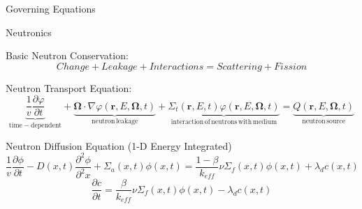 \documentclass{beamer}
\begin{document}
\begin{section}{Governing Equations}
\begin{frame}{Neutronics}
\begin{customlist}{2ex}{0pt}

    \item Basic Neutron Conservation:
    \[
      \nonumber Change + Leakage + Interactions = Scattering + Fission
    \]

    \item Neutron Transport Equation:
    \[
      \nonumber {\underbrace{\frac{1}{v}\frac{\partial\varphi}{\partial t}}_{\mathrm{time-dependent}}} + {\underbrace{\mathbf{\Omega}\cdot\nabla\varphi\left(\mathbf{r},E,\mathbf{\Omega},t\right)}_{\mathrm{neutron\, leakage}}}+\underbrace{\Sigma_{t}\left(\mathbf{r},E,t\right)\varphi\left(\mathbf{r},E,\mathbf{\Omega},t\right)}_{\mathrm{interaction\, of\, neutrons\, with\, medium}}=\underbrace{Q\left(\mathbf{r},E,\mathbf{\Omega},t\right)}_{\mathrm{neutron\, source}}
    \]

    \item Neutron Diffusion Equation (1-D Energy Integrated)
    \[
     \nonumber\frac{1}{v}\frac{\partial\phi}{\partial t}-D\left(x,t\right)\frac{\partial^{2} \phi}{\partial^{2} x}+\Sigma_{a}\left(x,t\right)\phi\left(x,t\right)=\frac{1-\beta}{k_{eff}}\nu\Sigma_{f}\left(x,t\right)\phi\left(x,t\right)+\lambda_{d}c\left(x,t\right)
    \]
    \[
    \nonumber\frac{\partial c}{\partial t}=\frac{\beta}{k_{eff}}\nu\Sigma_{f}\left(x,t\right)\phi\left(x,t\right)-\lambda_{d}c\left(x,t\right)   
    \]


\end{customlist}
\end{frame}
\end{section}
\end{document}
